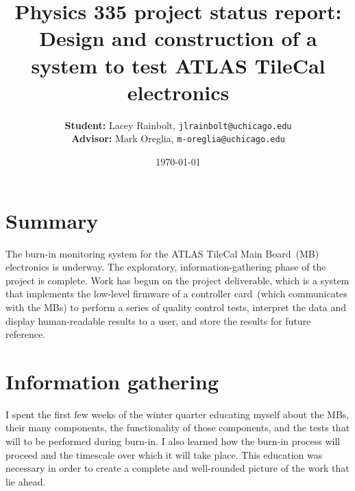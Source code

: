 \documentclass[11pt]{article}
\title{Physics 335 project status report: \\
	Design and construction of a system to test ATLAS TileCal electronics}
\author{\textbf{Student:} Lacey Rainbolt, \texttt{jlrainbolt@uchicago.edu} \\ \textbf{Advisor:} Mark Oreglia, \texttt{m-oreglia@uchicago.edu}}
\date{\today}
\begin{document}
\maketitle



\section{Summary}


The burn-in monitoring system for the ATLAS TileCal Main Board~(MB) electronics is underway.  The exploratory, information-gathering phase of the project is complete.  Work has begun on the project deliverable, which is a system that implements the low-level firmware of a controller card~(which communicates with the MBs) to perform a series of quality control tests, interpret the data and display human-readable results to a user, and store the results for future reference.



\section{Information gathering}

I spent the first few weeks of the winter quarter educating myself about the MBs, their many components, the functionality of those components, and the tests that will to be performed during burn-in.  I also learned how the burn-in process will proceed and the timescale over which it will take place.  This education was necessary in order to create a complete and well-rounded picture of the work that lie ahead.

%
\end{document}
